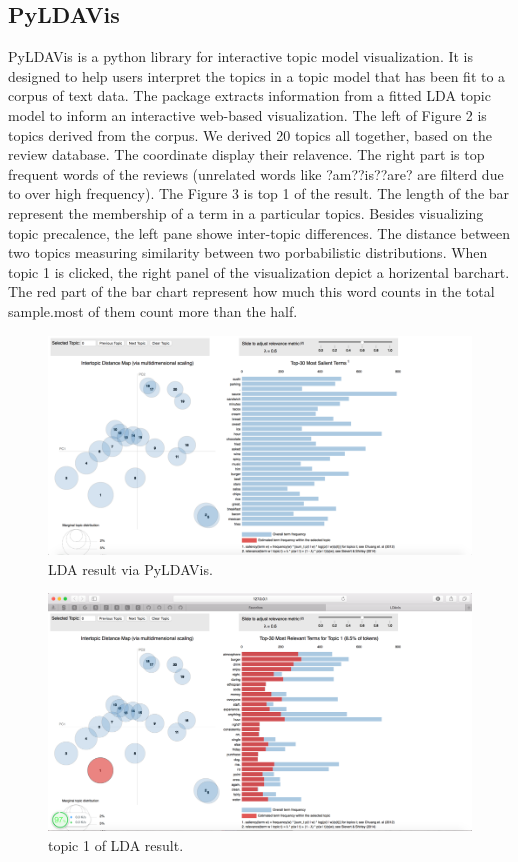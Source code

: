 \documentclass[a4paper]{article}
\begin{document}
\subsection{PyLDAVis}
PyLDAVis is a python library for interactive topic model visualization. It is designed to help users interpret the topics in a topic model that has been fit to a corpus of text data. The package extracts information from a fitted LDA topic model to inform an interactive web-based visualization. 
The left of Figure 2 is topics derived from the corpus. We derived 20 topics all together, based on the review database. The coordinate display their relavence. The right part is top frequent words of the reviews (unrelated words like ?am??is??are? are filterd due to over high frequency). 
The Figure 3 is top 1 of the result. The length of the bar represent the membership of a term in a particular topics. Besides visualizing topic precalence, the left pane showe inter-topic differences. The distance between two topics measuring similarity between two porbabilistic distributions. When topic 1 is clicked, the right panel of the visualization depict a horizental barchart. The red part of the bar chart represent how much this word counts in the total sample.most of them count more than the half.

\begin{figure}[htbp]
\centering
\includegraphics[width=1\textwidth]{Picture8.png}
\caption{\label{fig:data} LDA result via PyLDAVis. }
\end{figure}

\begin{figure}[htbp]
\centering
\includegraphics[width=1\textwidth]{Picture9.png}
\caption{\label{fig:data} topic 1 of LDA result. }
\end{figure}
\end{document}
